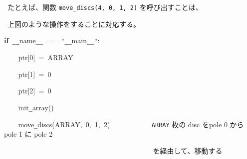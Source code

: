 \documentclass[a4paper,10pt]{article}
\def\mc{\relax}
\begin{document}
\noindent
\mbox{}\rm\mc {\tt\#} \ たとえば、関数 {\tt move\_discs(4, 0, 1, 2)} を呼び出すことは、 
\tt\mc 

\noindent
\mbox{}\rm\mc {\tt\#} \ 上図のような操作をすることに対応する。\hfill 
\tt\mc 

\noindent
\mbox{}\hfill

\noindent
\mbox{}\textbf{if}{\tt\mc \ }{\tt\_}{\tt\_}name{\tt\_}{\tt\_}{\tt\mc \ }=={\tt\mc \ }{\tt "}{\tt\_}{\tt\_}main{\tt\_}{\tt\_}{\tt "}:

\noindent
\mbox{}{\tt\mc \ }{\tt\mc \ }{\tt\mc \ }{\tt\mc \ }ptr[0]{\tt\mc \ }={\tt\mc \ }ARRAY

\noindent
\mbox{}{\tt\mc \ }{\tt\mc \ }{\tt\mc \ }{\tt\mc \ }ptr[1]{\tt\mc \ }={\tt\mc \ }0

\noindent
\mbox{}{\tt\mc \ }{\tt\mc \ }{\tt\mc \ }{\tt\mc \ }ptr[2]{\tt\mc \ }={\tt\mc \ }0

\noindent
\mbox{}\hfill

\noindent
\mbox{}{\tt\mc \ }{\tt\mc \ }{\tt\mc \ }{\tt\mc \ }init{\tt\_}array()

\noindent
\mbox{}{\tt\mc \ }{\tt\mc \ }{\tt\mc \ }{\tt\mc \ }move{\tt\_}discs(ARRAY,{\tt\mc \ }0,{\tt\mc \ }1,{\tt\mc \ }2){\tt\mc \ }{\tt\mc \ }{\tt\mc \ }{\tt\mc \ }{\tt\mc \ }{\tt\mc \ }{\tt\mc \ }{\tt\mc \ }{\tt\mc \ }{\tt\mc \ }\rm\mc {\tt\#} \ {\tt ARRAY} 枚の disc をpole 0 から pole 1 に pole 2\hfill 
\tt\mc 

\noindent
\mbox{}{\tt\mc \ }{\tt\mc \ }{\tt\mc \ }{\tt\mc \ }{\tt\mc \ }{\tt\mc \ }{\tt\mc \ }{\tt\mc \ }{\tt\mc \ }{\tt\mc \ }{\tt\mc \ }{\tt\mc \ }{\tt\mc \ }{\tt\mc \ }{\tt\mc \ }{\tt\mc \ }{\tt\mc \ }{\tt\mc \ }{\tt\mc \ }{\tt\mc \ }{\tt\mc \ }{\tt\mc \ }{\tt\mc \ }{\tt\mc \ }{\tt\mc \ }{\tt\mc \ }{\tt\mc \ }{\tt\mc \ }{\tt\mc \ }{\tt\mc \ }{\tt\mc \ }{\tt\mc \ }{\tt\mc \ }{\tt\mc \ }{\tt\mc \ }{\tt\mc \ }{\tt\mc \ }{\tt\mc \ }{\tt\mc \ }{\tt\mc \ }\rm\mc {\tt\#} \ を経由して、移動する \hfill 

\tt\mc 

\rm\mc
\end{document}
